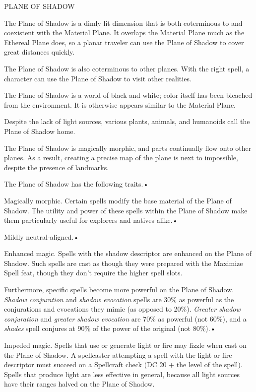 \documentclass{article}
\begin{document}
\vspace{12pt}
PLANE OF SHADOW

{\small{}The Plane of Shadow is a dimly lit dimension that is both coterminous 
to and coexistent with the Material Plane. It overlaps the Material }Plane much 
as the Ethereal Plane does, so a planar traveler can use the Plane of Shadow to 
cover great distances quickly.

The Plane of Shadow is also coterminous to other planes. With the right spell, 
a character can use the Plane of Shadow to visit other realities.

The Plane of Shadow is a world of black and white; color itself has been bleached 
from the environment. It is otherwise appears similar to the Material Plane.

Despite the lack of light sources, various plants, animals, and humanoids call 
the Plane of Shadow home.

The Plane of Shadow is magically morphic, and parts continually flow onto other 
planes. As a result, creating a precise map of the plane is next to impossible, 
despite the presence of landmarks.

The Plane of Shadow has the following traits.• 

\parindent=3pt
Magically morphic. Certain spells modify the base material of the Plane of Shadow. 
The utility and power of these spells within the Plane of Shadow make them particularly 
useful for explorers and natives alike.• 

Mildly neutral-aligned.• 

\parindent=7pt
Enhanced magic. Spells with the shadow descriptor are enhanced on the Plane of 
Shadow. Such spells are cast as though they were prepared with the Maximize Spell 
feat, though they don't require the higher spell slots.

\parindent=0pt
Furthermore, specific spells become more powerful on the Plane of Shadow. \textit{Shadow 
conjuration }and \textit{shadow evocation }spells are 30\% as powerful as the conjurations 
and evocations they mimic (as opposed to 20\%). \textit{Greater shadow conjuration 
}and \textit{greater shadow evocation }are 70\% as powerful (not 60\%), and a \textit{shades 
}spell conjures at 90\% of the power of the original (not 80\%).• 

\parindent=3pt
Impeded magic. Spells that use or generate light or fire may fizzle when cast on 
the Plane of Shadow. A spellcaster attempting a spell with the light or fire descriptor 
must succeed on a Spellcraft check (DC 20 + the level of the spell). Spells that 
produce light are less effective in general, because all light sources have their 
ranges halved on the Plane of Shadow.
\end{document}
